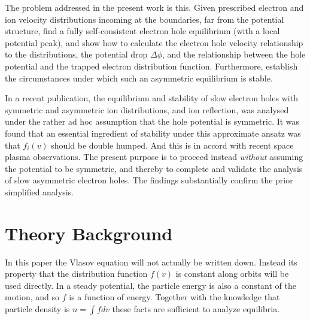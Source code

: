 \documentclass[pre]{revtex4-2}
\begin{document}
The problem addressed in the present work is this. Given prescribed
electron and ion velocity distributions incoming at the boundaries,
far from the potential structure, find a fully self-consistent
electron hole equilibrium (with a local potential peak), and show how
to calculate the electron hole velocity relationship to the
distributions, the potential drop $\Delta\phi$, and the relationship
between the hole potential and the trapped electron distribution
function. Furthermore, establish the circumstances under which such an
asymmetric equilibrium is stable.

In a recent publication\cite{Hutchinson2021c}, the equilibrium and
stability of slow electron holes with symmetric and asymmetric ion
distributions, and ion reflection, was analysed under the rather ad
hoc assumption that the hole potential is symmetric. It was found that
an essential ingredient of stability under this approximate ansatz was
that $f_i(v)$ should be double humped. And this is in accord with
recent space plasma observations\cite{Kamaletdinov2021}. The present
purpose is to proceed instead \emph{without} assuming the potential to
be symmetric, and thereby to complete and validate the analysis
of slow asymmetric electron holes. The findings substantially confirm
the prior simplified analysis.

\section{Theory Background}

In this paper the Vlasov equation will not actually be written
down. Instead its property that the distribution function $f(v)$ is
constant along orbits will be used directly. In a steady potential,
the particle energy is also a constant of the motion, and so $f$ is a
function of energy. Together with the knowledge that particle density
is $n=\int f dv$ these facts are sufficient to analyze equilibria.
\end{document}
